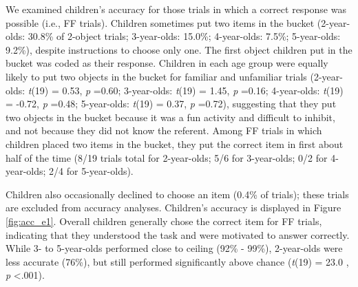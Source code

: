 \documentclass[a4paper,man,apacite,floatsintext]{apa6}
\begin{document}
We examined children's accuracy for those trials in which a correct
response was possible (i.e., FF trials). Children sometimes put two
items in the bucket (2-year-olds: 30.8\% of 2-object trials;
3-year-olds: 15.0\%; 4-year-olds: 7.5\%; 5-year-olds: 9.2\%), despite
instructions to choose only one. The first object children put in the
bucket was coded as their response. Children in each age group were
equally likely to put two objects in the bucket for familiar and
unfamiliar trials (2-year-olds: \emph{t}(19) = 0.53, \emph{p} =0.60;
3-year-olds: \emph{t}(19) = 1.45, \emph{p} =0.16; 4-year-olds:
\emph{t}(19) = -0.72, \emph{p} =0.48; 5-year-olds: \emph{t}(19) = 0.37,
\emph{p} =0.72), suggesting that they put two objects in the bucket
because it was a fun activity and difficult to inhibit, and not because
they did not know the referent. Among FF trials in which children placed
two items in the bucket, they put the correct item in first about half
of the time (8/19 trials total for 2-year-olds; 5/6 for 3-year-olds; 0/2
for 4-year-olds; 2/4 for 5-year-olds).

Children also occasionally declined to choose an item (0.4\% of trials);
these trials are excluded from accuracy analyses. Children's accuracy is
displayed in Figure \ref{fig:acc_e1}. Overall children generally chose
the correct item for FF trials, indicating that they understood the task
and were motivated to answer correctly. While 3- to 5-year-olds
performed close to ceiling (92\% - 99\%), 2-year-olds were less accurate
(76\%), but still performed significantly above chance (\emph{t}(19) =
23.0 , \emph{p} \textless{}.001).
\end{document}
